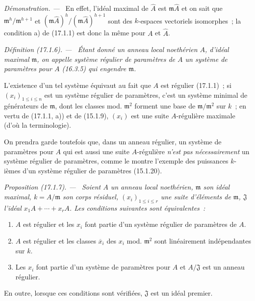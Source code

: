 \documentclass[10pt,oneside]{book}
\makeatletter
\newcommand{\setmanualcurrentlabel}[1]{\def\@currentlabel{#1}}
\newcommand{\oldpage}[2][]{%
  \setcounter{footnote}{0}%
  \marginpar{\scriptsize\textbf{#1}~|~#2}\ignorespaces}
\newenvironment{definition}[1][]{%
  \setmanualcurrentlabel{#1}\par\medskip\noindent\itshape Définition (#1). ---\ }{\par}
\newenvironment{proposition}[1][]{%
  \setmanualcurrentlabel{#1}\par\medskip\noindent\itshape Proposition (#1). ---\ }{\par}
\newenvironment{proof}{%
  \par\medskip\noindent\textit{Démonstration. ---\ }}{\par}
\makeatother
\begin{document}
\begin{proof}
\oldpage[0\textsubscript{IV-1}]{41}
En effet, l'idéal maximal de $\widehat{A}$ est $\mathfrak{m}\widehat{A}$ et on
sait que $\mathfrak{m}^h/\mathfrak{m}^{h+1}$ et
$(\mathfrak{m}\widehat{A})^h/(\mathfrak{m}\widehat{A})^{h+1}$ sont des
$k$-espaces vectoriels isomorphes~; la condition a) de (17.1.1) est donc la
même pour $A$ et $\widehat{A}$.
\end{proof}

\begin{definition}[17.1.6]
\label{0.17.1.6-fr}
Étant donné un anneau local noethérien $A$, d'idéal maximal $\mathfrak{m}$, on
appelle \emph{système régulier de paramètres de $A$} un système de paramètres
pour $A$ (16.3.5) qui engendre $\mathfrak{m}$.
\end{definition}

L'existence d'un tel système équivaut au fait que $A$ est régulier (17.1.1)~;
si $(x_i)_{1\leq i\leq n}$ est un système régulier de paramètres, c'est un
système minimal de générateurs de $\mathfrak{m}$, dont les classes mod.
$\mathfrak{m}^2$ forment une base de $\mathfrak{m}/\mathfrak{m}^2$ sur $k$~;
en vertu de (17.1.1, a)) et de (15.1.9), $(x_i)$ est une suite $A$-régulière
maximale (d'où la terminologie).

On prendra garde toutefois que, dans un anneau régulier, un système de
paramètres pour $A$ qui est aussi une suite $A$-régulière \emph{n'est pas
nécessairement} un système régulier de paramètres, comme le montre l'exemple
des puissances $k$-ièmes d'un système régulier de paramètres (15.1.20).

\begin{proposition}[17.1.7]
\label{0.17.1.7-fr}
Soient $A$ un anneau local noethérien, $\mathfrak{m}$ son idéal maximal,
$k=A/\mathfrak{m}$ son corps résiduel, $(x_i)_{1\leq i\leq r}$ une suite
d'éléments de $\mathfrak{m}$, $\mathfrak{J}$ l'idéal
$x_1A+\cdots+x_rA$. Les conditions suivantes sont équivalentes~:
\begin{enumerate}
  \item[\rm a)] $A$ est régulier et les $x_i$ font partie d'un système
  régulier de paramètres de $A$.
  \item[\rm a')] $A$ est régulier et les classes $\overline{x}_i$ des $x_i$
  mod. $\mathfrak{m}^2$ sont linéairement indépendantes sur $k$.
  \item[\rm b)] Les $x_i$ font partie d'un système de paramètres pour $A$ et
  $A/\mathfrak{J}$ est un anneau régulier.
\end{enumerate}
En outre, lorsque ces conditions sont vérifiées, $\mathfrak{J}$ est un idéal
premier.
\end{proposition}
\end{document}
